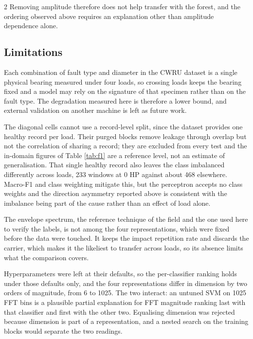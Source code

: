 \documentclass[12pt,twoside,titlepage]{ingenius}
\begin{document}
\begin{multicols}{2}
Removing amplitude therefore does not help transfer with the forest, and the
ordering observed above requires an explanation other than amplitude dependence
alone.

\subsection{Limitations}

Each combination of fault type and diameter in the CWRU dataset is a single
physical bearing measured under four loads, so crossing loads keeps the bearing
fixed and a model may rely on the signature of that specimen rather than on the
fault type. The degradation measured here is therefore a lower bound, and
external validation on another machine is left as future work.

The diagonal cells cannot use a record-level split, since the dataset provides
one healthy record per load. Their purged blocks remove leakage through overlap
but not the correlation of sharing a record; they are excluded from every test
and the in-domain figures of Table \ref{tab:f1} are a reference level, not an
estimate of generalisation. That single healthy record also leaves the class
imbalanced differently across loads, 233 windows at 0 HP against about 468
elsewhere. Macro-F1 and class weighting mitigate this, but the perceptron
accepts no class weights and the direction asymmetry reported above is
consistent with the imbalance being part of the cause rather than an effect of
load alone.

The envelope spectrum, the reference technique of the field and the one used
here to verify the labels, is not among the four representations, which were
fixed before the data were touched. It keeps the impact repetition rate and
discards the carrier, which makes it the likeliest to transfer across loads, so
its absence limits what the comparison covers.

Hyperparameters were left at their defaults, so the per-classifier ranking holds
under those defaults only, and the four representations differ in dimension by
two orders of magnitude, from 6 to 1025. The two interact: an untuned SVM on
1025 FFT bins is a plausible partial explanation for FFT magnitude ranking last
with that classifier and first with the other two. Equalising dimension was
rejected because dimension is part of a representation, and a nested search on
the training blocks would separate the two readings.


\end{multicols}
\end{document}
